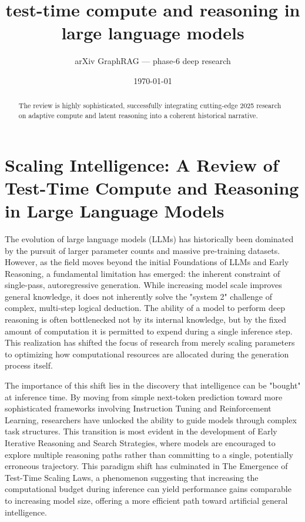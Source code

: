 \documentclass[11pt]{article}
\title{test-time compute and reasoning in large language models}
\author{arXiv GraphRAG --- phase-6 deep research}
\date{\today}
\begin{document}
\maketitle

\begin{abstract}
The review is highly sophisticated, successfully integrating cutting-edge 2025 research on adaptive compute and latent reasoning into a coherent historical narrative.
\end{abstract}

\section{Scaling Intelligence: A Review of Test-Time Compute and Reasoning in Large Language Models}

The evolution of large language models (LLMs) has historically been dominated by the pursuit of larger parameter counts and massive pre-training datasets. However, as the field moves beyond the initial Foundations of LLMs and Early Reasoning, a fundamental limitation has emerged: the inherent constraint of single-pass, autoregressive generation. While increasing model scale improves general knowledge, it does not inherently solve the "system 2" challenge of complex, multi-step logical deduction. The ability of a model to perform deep reasoning is often bottlenecked not by its internal knowledge, but by the fixed amount of computation it is permitted to expend during a single inference step. This realization has shifted the focus of research from merely scaling parameters to optimizing how computational resources are allocated during the generation process itself.

The importance of this shift lies in the discovery that intelligence can be "bought" at inference time. By moving from simple next-token prediction toward more sophisticated frameworks involving Instruction Tuning and Reinforcement Learning, researchers have unlocked the ability to guide models through complex task structures. This transition is most evident in the development of Early Iterative Reasoning and Search Strategies, where models are encouraged to explore multiple reasoning paths rather than committing to a single, potentially erroneous trajectory. This paradigm shift has culminated in The Emergence of Test-Time Scaling Laws, a phenomenon suggesting that increasing the computational budget during inference can yield performance gains comparable to increasing model size, offering a more efficient path toward artificial general intelligence.
\end{document}
